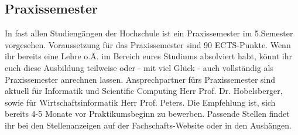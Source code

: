 \subsection{Praxissemester}
In fast allen Studiengängen der Hochschule ist ein Praxissemester im 
5.Semester vorgesehen. Voraussetzung für das Praxissemester sind 
90 ECTS-Punkte. Wenn ihr bereits eine Lehre o.Ä. im Bereich eures 
Studiums absolviert habt, könnt ihr euch diese Ausbildung teilweise oder - mit viel Glück - auch vollständig als
Praxissemester anrechnen lassen. Ansprechpartner fürs Praxissemester 
sind aktuell für Informatik und Scientific Computing Herr Prof. Dr. Hobelsberger, sowie für Wirtschaftsinformatik Herr Prof. Peters.\doublebreak
Die Empfehlung ist, sich bereits 4-5 Monate vor Praktikumsbeginn zu 
bewerben. Passende Stellen findet ihr bei den Stellenanzeigen auf der 
Fachschafts-Website oder in den Aushängen.